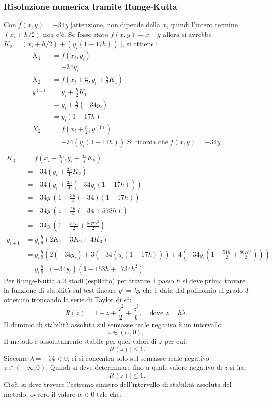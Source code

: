 \documentclass[11pt]{article}
\begin{document}
\subsubsection{Risoluzione numerica tramite Runge-Kutta}
Con $f(x, y)=-34y$ [attenzione, non dipende dalla $x$, quindi l'intero termine $(x_i+h/2)$ non c'è. Se fosse stato $f(x, y)=x+y$ allora si avrebbe $K_2=(x_i+h/2)+(y_i(1-17h))$ ], si ottiene :
\begin{align}
K_1&=f(x_i, y_i)\\
	&=-34y_i\\
	K_2&=f(x_i+\frac{h}{2} ,y_i+\frac{h}{2}K_1)\\
	y^{(1)}&=y_i+\frac{h}{2}K_1\\
	&=y_i+\frac{h}{2}(-34y_i)\\
	&=y_i(1-17h)\\
	K_2&=f(x_i+\frac{h}{2} ,y^{(1)})\\
	&=-34(y_i(1-17h))\text{ Si ricorda che $f(x,y)=-34y$}\\
\end{align}
\begin{align}
	K_3&=f(x_i+\frac{3h}{4} ,y_i+\frac{3h}{4}K_2)\\
	&=-34(y_i+\frac{3h}{4}K_2)\\
	&=-34(y_i+\frac{3h}{4}(-34y_i(1-17h)))\\
	&=-34y_i(1+\frac{3h}{4}(-34)(1-17h))\\
	&=-34y_i(1+\frac{3h}{4}(-34+578h))\\
	&=-34y_i(1-\frac{51h}{2}+\frac{867h^2}{2})\\
	y_{i+1}&=y_i\frac{h}{9}(2K_1+3K_2+4K_3)\\
	&=y_i\frac{h}{9}(2(-34y_i)+3(-34(y_i(1-17h)))+4(-34y_i(1-\frac{51h}{2}+\frac{867h^2}{2})))\\
	&=y_i\frac{h}{9}\cdot(-34y_i)(9-153h+1734h^2)
\end{align}
Per Runge-Kutta a 3 stadi (esplicito) per trovare il passo $h$ si deve prima trovare la funzione di stabilità sul test lineare $y' = \lambda y$ che è data dal polinomio di grado 3 ottenuto troncando la serie di Taylor di $e^z$:
\[
R(z) = 1 + z + \frac{z^2}{2} + \frac{z^3}{6}, \quad \text{dove } z = h\lambda.
\]
Il dominio di stabilità assoluta sul semiasse reale negativo è un intervallo:
\[
z \in (\alpha, 0),
\]
Il metodo è assolutamente stabile per quei valori di $z$ per cui:
\[
|R(z)| \leq 1.
\]
Siccome $\lambda = -34 < 0$, ci si concentra solo sul semiasse reale negativo $z \in (-\infty, 0)$. Quindi si deve determinare fino a quale valore negativo di $z$ si ha:
\[
|R(z)| \leq 1.
\]
Cioè, si deve trovare l'estremo sinistro dell'intervallo di stabilità assoluta del metodo, ovvero il valore $\alpha < 0$ tale che:
\end{document}
